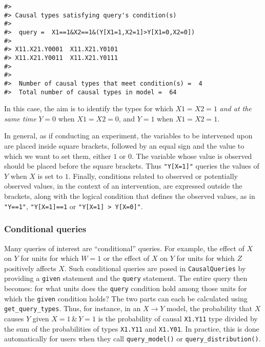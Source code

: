 \documentclass[
  11pt,
  article]{jss}
\begin{document}
\begin{verbatim}
#> 
#> Causal types satisfying query's condition(s)  
#> 
#>  query =  X1==1&X2==1&(Y[X1=1,X2=1]>Y[X1=0,X2=0]) 
#> 
#> X11.X21.Y0001  X11.X21.Y0101
#> X11.X21.Y0011  X11.X21.Y0111
#> 
#> 
#>  Number of causal types that meet condition(s) =  4
#>  Total number of causal types in model =  64
\end{verbatim}

In this case, the aim is to identify the types for which \(X1=X2=1\)
\emph{and at the same time} \(Y=0\) when \(X1 = X2 = 0\), and \(Y = 1\)
when \(X1 = X2 = 1\).

In general, as if conducting an experiment, the variables to be
intervened upon are placed inside square brackets, followed by an equal
sign and the value to which we want to set them, either \(1\) or \(0\).
The variable whose value is observed should be placed before the square
brackets. Thus \texttt{"Y{[}X=1{]}"} queries the values of \(Y\) when
\(X\) is set to \(1\). Finally, conditions related to observed or
potentially observed values, in the context of an intervention, are
expressed outside the brackets, along with the logical condition that
defines the observed values, as in \texttt{"Y==1"},
\texttt{"Y{[}X=1{]}==1} or
\texttt{"Y{[}X=1{]}\ \textgreater{}\ Y{[}X=0{]}"}.

\hypertarget{conditional-queries}{%
\subsubsection{Conditional queries}\label{conditional-queries}}

Many queries of interest are ``conditional'' queries. For example, the
effect of \(X\) on \(Y\) for units for which \(W= 1\) or the effect of
\(X\) on \(Y\) for units for which \(Z\) positively affects \(X\). Such
conditional queries are posed in \texttt{CausalQueries} by providing a
\texttt{given} statement and the \texttt{query} statement. The entire
query then becomes: for what units does the \texttt{query} condition
hold among those units for which the \texttt{given} condition holds? The
two parts can each be calculated using \texttt{get\_query\_types}. Thus,
for instance, in an \(X \rightarrow Y\) model, the probability that
\(X\) causes \(Y\) given \(X=1 \, \& \, Y=1\) is the probability of
causal \texttt{X1.Y11} type divided by the sum of the probabilities of
types \texttt{X1.Y11} and \texttt{X1.Y01}. In practice, this is done
automatically for users when they call \texttt{query\_model()} or
\texttt{query\_distribution()}.
\end{document}
